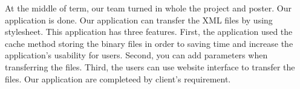 At the middle of term, our team turned in whole the project and poster.
Our application is done.
Our application can transfer the XML files by using stylesheet. 
This application has three features.
First, the application used the cache method storing the binary files in order to saving time and increase the application's usability for users.
Second, you can add parameters when transferring the files.
Third, the users can use website interface to transfer the files. 
Our application are completeed by client's requirement. 
